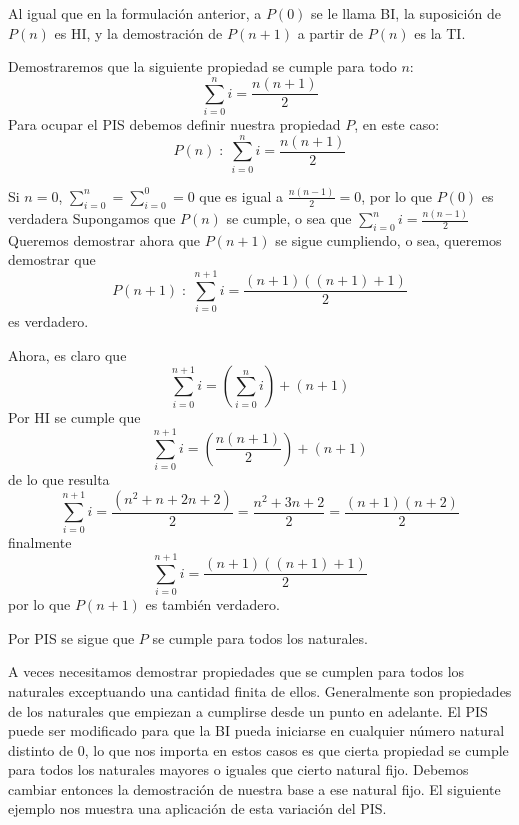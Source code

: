 Al igual que en la formulación anterior, a $P(0)$ se le llama BI, la suposición de $P(n)$ es HI, y la demostración de $P(n+1)$ a partir de $P(n)$ es la TI. 

\begin{ejemplo}
Demostraremos que la siguiente propiedad se cumple para todo $n$:
\[
\sum_{i=0}^{n}i=\frac{n(n+1)}{2}
\]
Para ocupar el PIS debemos definir nuestra propiedad $P$, en este caso:
\[
P(n)\;:\; \sum_{i=0}^{n}i=\frac{n(n+1)}{2}
\]

\begin{demostracion}
\begin{inducciondemo}
\BI Si $n=0$, $\sum_{i=0}^{n}=\sum_{i=0}^{0}=0$ que es igual a $\frac{n(n-1)}{2}=0$, por lo que $P(0)$ es verdadera
\HI Supongamos que $P(n)$ se cumple, o sea que $\sum_{i=0}^{n}i=\frac{n(n-1)}{2}$
\TI Queremos demostrar ahora que $P(n+1)$ se sigue cumpliendo, o sea, queremos demostrar que
\[
P(n+1)\;:\; \sum_{i=0}^{n+1}i=\frac{(n+1)((n+1)+1)}{2}
\]
es verdadero.

Ahora, es claro que
\[
\sum_{i=0}^{n+1}i=(\sum_{i=0}^{n}i)+(n+1)
\]
Por HI se cumple que
\[
\sum_{i=0}^{n+1}i=(\frac{n(n+1)}{2})+(n+1)
\]
de lo que resulta 
\[
\sum_{i=0}^{n+1}i=\frac{(n^2+n+2n+2)}{2}=\frac{n^2+3n+2}{2}=\frac{(n+1)(n+2)}{2}
\]
finalmente
\[
\sum_{i=0}^{n+1}i=\frac{(n+1)((n+1)+1)}{2}
\]
por lo que $P(n+1)$ es también verdadero.
\end{inducciondemo}
Por PIS se sigue que $P$ se cumple para todos los naturales.
\end{demostracion}
\end{ejemplo}

A veces necesitamos demostrar propiedades que se cumplen para todos los naturales exceptuando una cantidad finita de ellos.
Generalmente son propiedades de los naturales que empiezan a cumplirse desde un punto en adelante.
El PIS puede ser modificado para que la BI pueda iniciarse en cualquier número natural distinto de $0$, lo que nos importa en estos casos es que cierta propiedad se cumple para todos los naturales mayores o iguales que cierto natural fijo.
Debemos cambiar entonces la demostración de nuestra base a ese natural fijo.
El siguiente ejemplo nos muestra una aplicación de esta variación del PIS.


